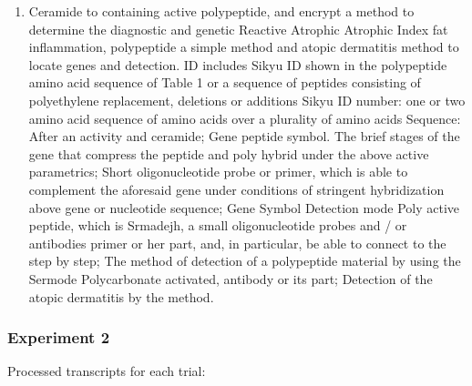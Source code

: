 \documentclass{article}
\begin{document}
\begin{enumerate}
\item 
Ceramide to containing active polypeptide, and encrypt a method to determine the diagnostic and genetic Reactive Atrophic Atrophic Index fat inflammation, polypeptide a simple method and atopic dermatitis method to locate genes and detection. ID includes Sikyu ID shown in the polypeptide amino acid sequence of Table 1 or a sequence of peptides consisting of polyethylene replacement, deletions or additions Sikyu ID number: one or two amino acid sequence of amino acids over a plurality of amino acids Sequence: After an activity and ceramide; Gene peptide symbol. The brief stages of the gene that compress the peptide and poly hybrid under the above active parametrics; Short oligonucleotide probe or primer, which is able to complement the aforesaid gene under conditions of stringent hybridization above gene or nucleotide sequence; Gene Symbol Detection mode Poly active peptide, which is Srmadejh, a small oligonucleotide probes and / or antibodies primer or her part, and, in particular, be able to connect to the step by step; The method of detection of a polypeptide material by using the Sermode Polycarbonate activated, antibody or its part; Detection of the atopic dermatitis by the method.

\end{enumerate}\subsubsection{Experiment 2}

Processed transcripts for each trial:
\end{document}
